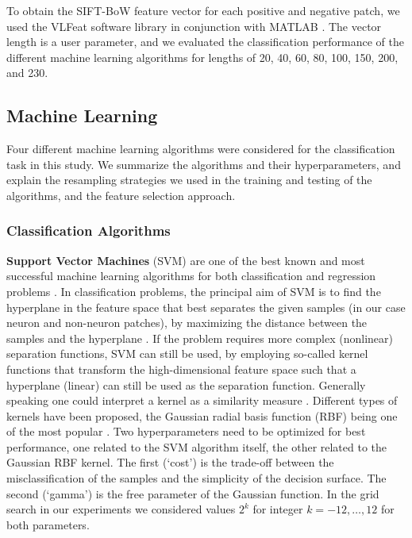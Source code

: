 To obtain the SIFT-BoW feature vector for each positive and negative patch, we used the VLFeat software library \citep{vedaldi08vlfeat} in conjunction with MATLAB \citep{MATLAB2016}. The vector length is a user parameter, and we evaluated the classification performance of the different machine learning algorithms for lengths of 20, 40, 60, 80, 100, 150, 200, and 230.

\subsection{Machine Learning}
\label{subsec:machineLearning}

Four different machine learning algorithms were considered for the classification task in this study. We summarize the algorithms and their hyperparameters, and explain the resampling strategies we used in the training and testing of the algorithms, and the feature selection approach.

\subsubsection{Classification Algorithms}
\label{subsubsec:classifiers}

{\bf Support Vector Machines} (SVM) are one of the best known and most successful machine learning algorithms for both classification and regression problems \citep{Boser92atraining, zbMATH01332320, Vapnik99thenature, Bishop-2006}. In classification problems, the principal aim of SVM is to find the hyperplane in the feature space that best separates the given samples (in our case neuron and non-neuron patches), by maximizing the distance between the samples and the hyperplane \citep{Burges1998}. If the problem requires more complex (nonlinear) separation functions, SVM can still be used, by employing so-called kernel functions that transform the high-dimensional feature space such that a hyperplane (linear) can still be used as the separation function. Generally speaking one could interpret a kernel as a similarity measure \citep{2549}. Different types of kernels have been proposed, the Gaussian radial basis function (RBF) being one of the most popular \citep{Cristianini:1999:ISV:345662}. Two hyperparameters need to be optimized for best performance, one related to the SVM algorithm itself, the other related to the Gaussian RBF kernel. The first (`cost') is the trade-off between the misclassification of the samples and the simplicity of the decision surface. The second (`gamma') is the free parameter of the Gaussian function. In the grid search in our experiments we considered values $2^k$ for integer $k=-12,\dots,12$ for both parameters.

